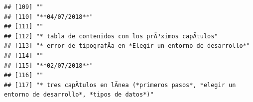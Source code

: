 \documentclass[
]{book}
\begin{document}
\begin{verbatim}
## [109] ""                                                                                                                                                                                                                                                                                                        
## [110] "**04/07/2018**"                                                                                                                                                                                                                                                                                          
## [111] ""                                                                                                                                                                                                                                                                                                        
## [112] "* tabla de contenidos con los prÃ³ximos capÃ­tulos"                                                                                                                                                                                                                                                      
## [113] "* error de tipografÃ­a en *Elegir un entorno de desarrollo*"                                                                                                                                                                                                                                             
## [114] ""                                                                                                                                                                                                                                                                                                        
## [115] "**02/07/2018**"                                                                                                                                                                                                                                                                                          
## [116] ""                                                                                                                                                                                                                                                                                                        
## [117] "* tres capÃ­tulos en lÃ­nea (*primeros pasos*, *elegir un entorno de desarrollo*, *tipos de datos*)"
\end{verbatim}
\end{document}
